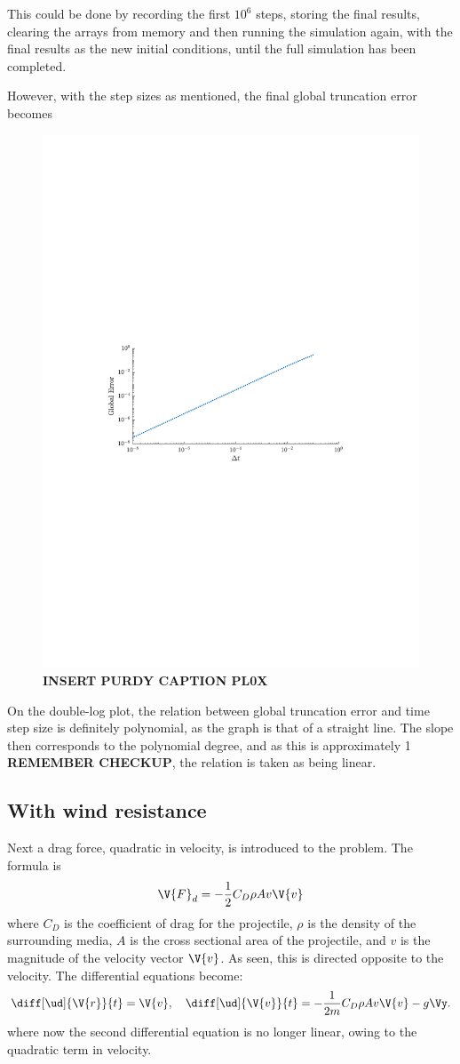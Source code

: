\documentclass[a4paper,10pt]{article} 	%
\numberwithin{equation}{section}
\begin{document}
	This could be done by recording the first $ 10^6 $ steps, storing the final results, clearing the arrays from memory and then running the simulation again, with the final results as the new initial conditions, until the full simulation has been completed.
	
	However, with the step sizes as mentioned, the final global truncation error becomes
	\begin{figure}[H]
		\centering
		\includegraphics[width=0.7\linewidth]{projError.pdf}
		\caption{\textbf{INSERT PURDY CAPTION PL0X}}
		\label{fig:projError}
	\end{figure}
	On the double-log plot, the relation between global truncation error and time step size is definitely polynomial, as the graph is that of a straight line. The slope then corresponds to the polynomial degree, and as this is approximately 1 \textbf{REMEMBER CHECKUP}, the relation is taken as being linear.
	
	\subsection{With wind resistance}
	Next a drag force, quadratic in velocity, is introduced to the problem. The formula is
	\begin{equation}\label{key}
		\V{F}_d = -\frac{1}{2}C_D \rho A v \V{v}
 	\end{equation} 
 	where $ C_D $ is the coefficient of drag for the projectile, $ \rho $ is the density of the surrounding media, $ A $ is the cross sectional area of the projectile, and $ v $ is the magnitude of the velocity vector $ \V{v} $. As seen, this is directed opposite to the velocity. The differential equations become:
 	\begin{equation}\label{key}
 			\diff[\ud]{\V{r}}{t} = \V{v}, \quad \diff[\ud]{\V{v}}{t} = -\frac{1}{2m}C_D \rho A v \V{v} -g\Vy.
 	\end{equation}
 	where now the second differential equation is no longer linear, owing to the quadratic term in velocity.
 	
\end{document}
